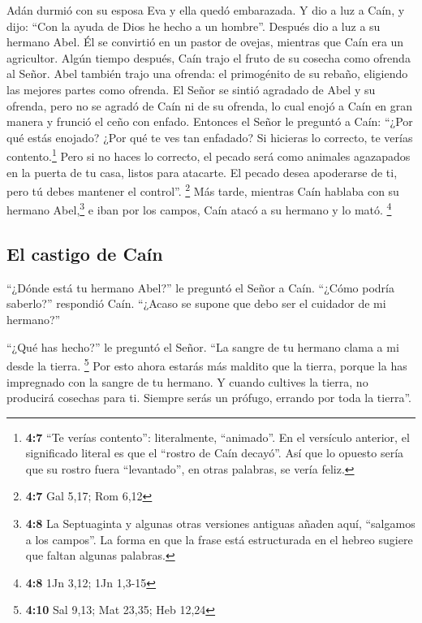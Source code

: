  Adán durmió con su esposa Eva y ella quedó embarazada. Y
dio a luz a Caín, y dijo: ``Con la ayuda de Dios he hecho a un hombre''.
 Después dio a luz a su hermano Abel. Él se convirtió en
un pastor de ovejas, mientras que Caín era un agricultor. 
Algún tiempo después, Caín trajo el fruto de su cosecha como ofrenda al
Señor.  Abel también trajo una ofrenda: el primogénito de
su rebaño, eligiendo las mejores partes como ofrenda. El Señor se sintió
agradado de Abel y su ofrenda,  pero no se agradó de Caín
ni de su ofrenda, lo cual enojó a Caín en gran manera y frunció el ceño
con enfado.  Entonces el Señor le preguntó a Caín: ``¿Por
qué estás enojado? ¿Por qué te ves tan enfadado?  Si
hicieras lo correcto, te verías contento.\footnote{\textbf{4:7} ``Te
  verías contento'': literalmente, ``animado''. En el versículo
  anterior, el significado literal es que el ``rostro de Caín decayó''.
  Así que lo opuesto sería que su rostro fuera ``levantado'', en otras
  palabras, se vería feliz.} Pero si no haces lo correcto, el pecado
será como animales agazapados en la puerta de tu casa, listos para
atacarte. El pecado desea apoderarse de ti, pero tú debes mantener el
control''. \footnote{\textbf{4:7} Gal 5,17; Rom 6,12}  Más
tarde, mientras Caín hablaba con su hermano Abel,\footnote{\textbf{4:8}
  La Septuaginta y algunas otras versiones antiguas añaden aquí,
  ``salgamos a los campos''. La forma en que la frase está estructurada
  en el hebreo sugiere que faltan algunas palabras.} e iban por los
campos, Caín atacó a su hermano y lo mató. \footnote{\textbf{4:8} 1Jn
  3,12; 1Jn 1,3-15}

\hypertarget{el-castigo-de-cauxedn}{%
\subsection{El castigo de Caín}\label{el-castigo-de-cauxedn}}

 ``¿Dónde está tu hermano Abel?'' le preguntó el Señor a
Caín. ``¿Cómo podría saberlo?'' respondió Caín. ``¿Acaso se supone que
debo ser el cuidador de mi hermano?''

 ``¿Qué has hecho?'' le preguntó el Señor. ``La sangre de
tu hermano clama a mi desde la tierra. \footnote{\textbf{4:10} Sal 9,13;
  Mat 23,35; Heb 12,24}  Por esto ahora estarás más
maldito que la tierra, porque la has impregnado con la sangre de tu
hermano.  Y cuando cultives la tierra, no producirá
cosechas para ti. Siempre serás un prófugo, errando por toda la
tierra''.

